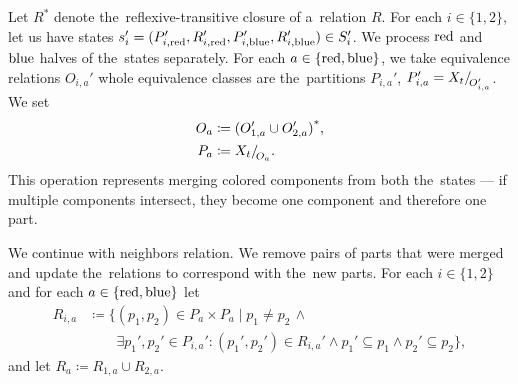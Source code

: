 Let \( R^* \) denote the~reflexive-transitive closure of a~relation \( R \).
For each \( i \in \{1, 2\} \), let us have states
\( s_i' = (P_{i,\text{red}}', R_{i,\text{red}}', P_{i,\text{blue}}', R_{i,\text{blue}}') \in S_i' \).
%
We process \( \text{red} \) and \( \text{blue} \) halves of the~states separately.
For each \( a \in \{\text{red}, \text{blue}\} \),
we take equivalence relations \( O_{i, a}' \)
whole equivalence classes are the~partitions \( P_{i, a}' \),
\( P_{i, a}' = X_t{/\!}_{O_{i, a}'}\).
We set
%
\begin{equation}%
	\label{eq:fpt_reflexive_transitive_closure}
	\begin{aligned}
		O_a & \coloneqq {(O_{1, a}' \cup O_{2, a}')}^*, \\
		P_a & \coloneqq \equivclass{X_t}{O_a}.
	\end{aligned}
\end{equation}
%
This operation represents merging colored components from both the~states
--- if multiple components intersect, they become one
component and therefore one part.

We continue with neighbors relation. We remove pairs of parts
that were merged and update the~relations to correspond with the~new parts.
For each \( i \in \{1, 2\} \) and for each \( a \in \{\text{red}, \text{blue}\} \) let
%
\begin{align*}
	R_{i,a} & \coloneqq \{(p_1, p_2) \in P_a \times P_a \mid p_{1} \ne p_{2} \, \land                                                 \\
	        & \qquad \exists p_1', p_2' \in P_{i,a}' : (p_1', p_2') \in R_{i,a}' \land p_1' \subseteq p_1 \land p_2' \subseteq p_2\},
\end{align*}
%
and let \( R_a \coloneqq R_{1,a} \cup R_{2,a} \).


